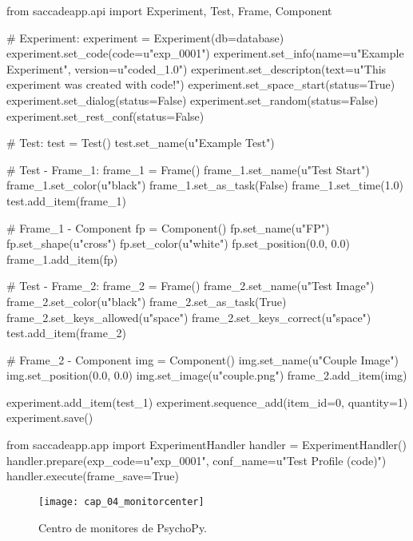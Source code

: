 \documentclass[\main/main.tex]{subfiles}
\begin{document}
\begin{singlespace}\begin{python}
from saccadeapp.api import Experiment, Test, Frame, Component

# Experiment:
experiment = Experiment(db=database)
experiment.set_code(code=u"exp_0001")
experiment.set_info(name=u"Example Experiment", version=u"coded_1.0")
experiment.set_descripton(text=u"This experiment was created with code!")
experiment.set_space_start(status=True)
experiment.set_dialog(status=False)
experiment.set_random(status=False)
experiment.set_rest_conf(status=False)

# Test: 
test = Test()
test.set_name(u"Example Test")

# Test - Frame_1: 
frame_1 = Frame()
frame_1.set_name(u"Test Start")
frame_1.set_color(u"black")
frame_1.set_as_task(False)
frame_1.set_time(1.0)
test.add_item(frame_1)

# Frame_1 - Component
fp = Component()
fp.set_name(u"FP")
fp.set_shape(u"cross")
fp.set_color(u"white")
fp.set_position(0.0, 0.0)
frame_1.add_item(fp)

# Test - Frame_2:
frame_2 = Frame()
frame_2.set_name(u"Test Image")
frame_2.set_color(u"black")
frame_2.set_as_task(True)
frame_2.set_keys_allowed(u"space")
frame_2.set_keys_correct(u"space")
test.add_item(frame_2)

# Frame_2 - Component
img = Component()
img.set_name(u"Couple Image")
img.set_position(0.0, 0.0)
img.set_image(u"couple.png")
frame_2.add_item(img)

experiment.add_item(test_1)
experiment.sequence_add(item_id=0, quantity=1)
experiment.save()
\end{python}\end{singlespace}

\begin{singlespace}\begin{python}
from saccadeapp.app import ExperimentHandler
handler = ExperimentHandler()
handler.prepare(exp_code=u"exp_0001", conf_name=u"Test Profile (code)")
handler.execute(frame_save=True)
\end{python}\end{singlespace}


\begin{figure}[H]
    \centering
    \texttt{[image: cap\_04\_monitorcenter]}
    \caption{Centro de monitores de PsychoPy.}
    \label{fig:04_monitor_center}
\end{figure} 


    \newpage
\end{document}
